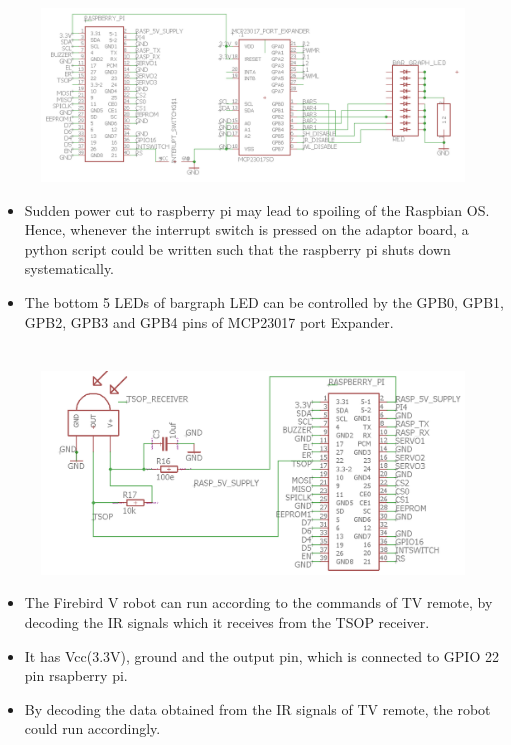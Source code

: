 \documentclass[a4paper,12pt,oneside]{book}
\begin{document}
\section*{\textbf{\fontsize{20}{10}\selectfont{10.Interrupt switch and controlling bargraph leds}}}
\begin{figure}[h]
	\includegraphics[width=1\textwidth]{interupt_bargraph}
\end{figure}
\hfill
\begin{itemize}
	\item {Sudden power cut to raspberry pi may lead to spoiling of the Raspbian OS. Hence, whenever the interrupt switch is pressed on the adaptor board, a python script could be written such that the raspberry pi shuts down systematically.}
	\item {The bottom 5 LEDs of bargraph LED can be controlled by the GPB0,  GPB1, GPB2, GPB3 and GPB4 pins of MCP23017 port Expander.}
\end{itemize}
\pagebreak

\section*{\textbf{\fontsize{20}{10}\selectfont{11.TSOP1738 RC5 IR receiver and decoder}}}
\begin{figure}[h]
	\includegraphics[width=1\textwidth]{tsop}
\end{figure}
\hfill
\begin{itemize}
	\item {The Firebird V robot can run according to the commands of TV remote, by decoding the IR signals which it receives from the TSOP receiver. }
	\item {It has Vcc(3.3V), ground and the output pin, which is connected to GPIO 22 pin rsapberry pi.}
	\item {By decoding the data obtained from the IR signals of TV remote, the robot could run accordingly.}
\end{itemize}
\pagebreak
\end{document}
